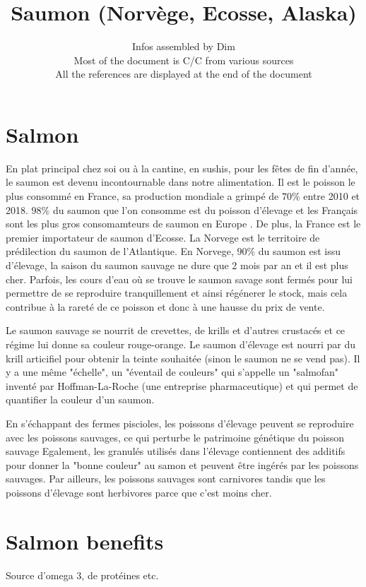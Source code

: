 \documentclass{article}
\title{\textbf{Saumon (Norvège, Ecosse, Alaska)}}
\date{Infos assembled by Dim \\
Most of the document is C/C from various sources\\
All the references are displayed at the end of the document
}
\begin{document}
\maketitle

\newpage
\tableofcontents
\newpage

\section{Salmon}
En plat principal chez soi ou à la cantine, en sushis, pour les fêtes de fin d'année, le saumon est devenu incontournable dans notre alimentation.
Il est le poisson le plus consommé en France, sa production mondiale a grimpé de $70\%$ entre 2010 et 2018. $98\%$ du saumon que l'on consomme est du poisson d'élevage et les Français sont les plus gros consomamteurs de saumon en Europe \cite{FT3}. De plus, la France est le premier importateur de saumon d'Ecosse. 
La Norvege est le territoire de prédilection du saumon de l'Atlantique.
En Norvege, $90 \%$ du saumon est issu d'élevage, la saison du saumon sauvage ne dure que 2 mois par an et il est plus cher. Parfois, les cours d'eau où se trouve le saumon savage sont fermés pour lui permettre de se reproduire tranquillement et ainsi régénerer le stock, mais cela contribue à la rareté de ce poisson et donc à une hausse du prix de vente.

Le saumon sauvage se nourrit de crevettes, de krills et d'autres crustacés et ce régime lui donne sa couleur rouge-orange.
Le saumon d'élevage est nourri par du krill articifiel pour obtenir la teinte souhaitée (sinon le saumon ne se vend pas). Il y a une même "échelle", un "éventail de couleurs" qui s'appelle un "salmofan" inventé par Hoffman-La-Roche (une entreprise pharmaceutique) et qui permet de quantifier la couleur d'un saumon.

En s'échappant des fermes piscioles, les poissons d'élevage peuvent se reproduire avec les poissons sauvages, ce qui perturbe le patrimoine génétique du poisson sauvage
Egalement, les granulés utilisés dans l'élevage contiennent des additifs pour donner la "bonne couleur" au samon et peuvent être ingérés par les poissons sauvages. Par ailleurs, les poissons sauvages sont carnivores tandis que les poissons d'élevage sont herbivores parce que c'est moins cher.



\section{Salmon benefits}
Source d'omega 3, de protéines etc.
\end{document}

